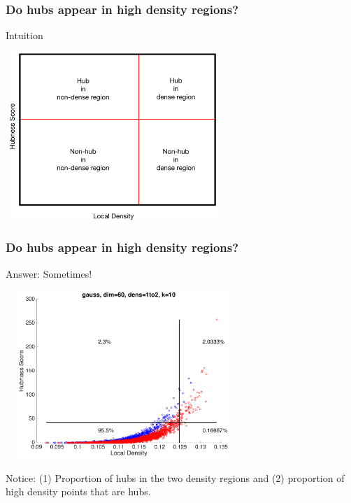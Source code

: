 \documentclass{beamer}
\begin{document}
\begin{frame}
\frametitle{Do hubs appear in high density regions?}

Intuition

\smallskip

\centering
\includegraphics[width=3.2in,height=2.5in]{./fig/DensHub-Intuition.png}

\end{frame}

\begin{frame}
\frametitle{Do hubs appear in high density regions?}

{\small Answer: Sometimes!}

\smallskip

\centering
\includegraphics[width=3.5in,height=2.5in]{./fig/gauss-dim60-1000to2000-k10-DensHub.png}

\smallskip

{\small Notice: (1) Proportion of hubs in the two density regions and (2) proportion of high density points that are hubs.}

\end{frame}
\end{document}

